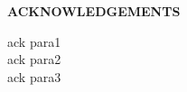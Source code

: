 \renewcommand\headrulewidth{0pt}
\begin{center}
\textup{\large{\textbf{ACKNOWLEDGEMENTS}}} \\[0.1in]
\end{center}
\begin{flushleft}
\textup{ack para1} \\[0.1in]
\textup{ack para2} \\[0.1in]
\textup{ack para3} 
\end{flushleft}
\pagebreak